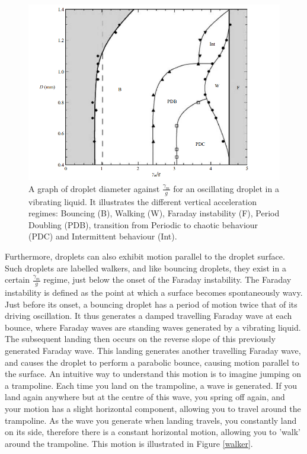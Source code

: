 \begin{figure}[ht]
\includegraphics[width=12cm]{theory/regime}
\centering
\caption{A graph of droplet diameter against $\frac{\gamma_{m}}{g}$ for an oscillating droplet in a vibrating liquid. It illustrates the different vertical acceleration regimes: Bouncing (B), Walking (W), Faraday instability (F), Period Doubling (PDB), transition from Periodic to chaotic behaviour (PDC)  and Intermittent behaviour (Int).}
\centering
\label{regimes}
\end{figure}

Furthermore, droplets can also exhibit motion parallel to the droplet surface. Such droplets are labelled walkers, and like bouncing droplets, they exist in a certain $\frac{\gamma_{m}}{g}$ regime, just below the onset of the Faraday instability. The Faraday instability is defined as the point at which a surface becomes spontaneously wavy. Just before its onset, a bouncing droplet has a period of motion twice that of its driving oscillation. It thus generates a damped travelling Faraday wave at each bounce, where Faraday waves are standing waves generated by a vibrating liquid. The subsequent landing then occurs on the reverse slope of this previously generated Faraday wave. This landing generates another travelling Faraday wave, and causes the droplet to perform a parabolic bounce, causing motion parallel to the surface. An intuitive way to understand this motion is to imagine jumping on a trampoline. Each time you land on the trampoline, a wave is generated. If you land again anywhere but at the centre of this wave, you spring off again, and your motion has a slight horizontal component, allowing you to travel around the trampoline. As the wave you generate when landing travels, you constantly land on its side, therefore there is a constant horizontal motion, allowing you to 'walk' around the trampoline. This motion is illustrated in Figure \ref{walker}. 

